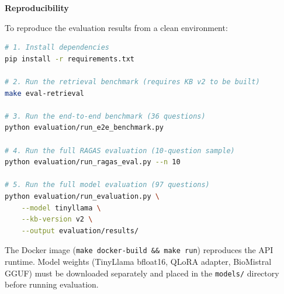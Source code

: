 \vspace{0.5cm}
\noindent\textbf{Reproducibility}

To reproduce the evaluation results from a clean environment:

\begin{lstlisting}[language=bash]
# 1. Install dependencies
pip install -r requirements.txt

# 2. Run the retrieval benchmark (requires KB v2 to be built)
make eval-retrieval

# 3. Run the end-to-end benchmark (36 questions)
python evaluation/run_e2e_benchmark.py

# 4. Run the full RAGAS evaluation (10-question sample)
python evaluation/run_ragas_eval.py --n 10

# 5. Run the full model evaluation (97 questions)
python evaluation/run_evaluation.py \
    --model tinyllama \
    --kb-version v2 \
    --output evaluation/results/
\end{lstlisting}

The Docker image (\texttt{make docker-build \&\& make run}) reproduces the API runtime. Model weights (TinyLlama bfloat16, QLoRA adapter, BioMistral GGUF) must be downloaded separately and placed in the \texttt{models/} directory before running evaluation.
